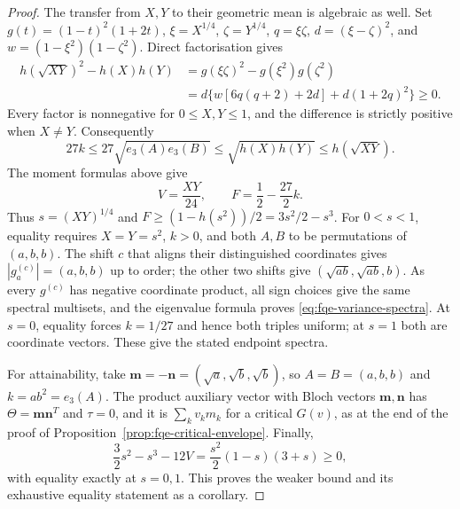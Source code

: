 \begin{proof}
The transfer from $X,Y$ to their geometric mean is algebraic as well.
Set $g(t)=(1-t)^2(1+2t)$, $\xi=X^{1/4}$, $\zeta=Y^{1/4}$,
$q=\xi\zeta$, $d=(\xi-\zeta)^2$, and
$w=(1-\xi^2)(1-\zeta^2)$. Direct factorisation gives
\begin{equation}\label{eq:fqe-product-transfer-remainder}
 \begin{split}
 h(\sqrt{XY})^2-h(X)h(Y)
 &=g(\xi\zeta)^2-g(\xi^2)g(\zeta^2)\\
 &=d\bigl\{w[6q(q+2)+2d]+d(1+2q)^2\bigr\}\ge0.
 \end{split}
\end{equation}
Every factor is nonnegative for $0\le X,Y\le1$, and the difference
is strictly positive when $X\ne Y$. Consequently
\[
27k\le27\sqrt{e_3(A)e_3(B)}
\le\sqrt{h(X)h(Y)}\le h(\sqrt{XY}).
\]
The moment formulas above give
\[
V=\frac{XY}{24},\qquad F=\frac12-\frac{27}{2}k.
\]
Thus $s=(XY)^{1/4}$ and $F\ge(1-h(s^2))/2=3s^2/2-s^3$.
For $0<s<1$, equality requires $X=Y=s^2$, $k>0$, and both $A,B$ to be
permutations of $(a,b,b)$. The shift $c$ that aligns their distinguished
coordinates gives $|g^{(c)}_a|=(a,b,b)$ up to order; the other two shifts give
$(\sqrt{ab},\sqrt{ab},b)$. As every $g^{(c)}$ has negative coordinate product,
all sign choices give the same spectral multisets, and the eigenvalue formula
proves \eqref{eq:fqe-variance-spectra}.
At $s=0$, equality forces $k=1/27$ and hence both triples uniform; at $s=1$
both are coordinate vectors. These give the stated endpoint spectra.

For attainability, take $\mathbf m=-\mathbf n=(\sqrt a,\sqrt b,\sqrt b)$, so $A=B=(a,b,b)$ and $k=ab^2=e_3(A)$.
The product auxiliary vector with Bloch vectors $\mathbf m,\mathbf n$ has $\Theta=\mathbf m\mathbf n^T$ and $\tau=0$, and it is
$\sum_kv_km_k$ for a critical $G(v)$, as at the end of the proof of Proposition~\ref{prop:fqe-critical-envelope}.
Finally,
\[
\frac32s^2-s^3-12V=\frac{s^2}{2}(1-s)(3+s)\ge0,
\]
with equality exactly at $s=0,1$. This proves the weaker bound and its
exhaustive equality statement as a corollary.
\end{proof}



